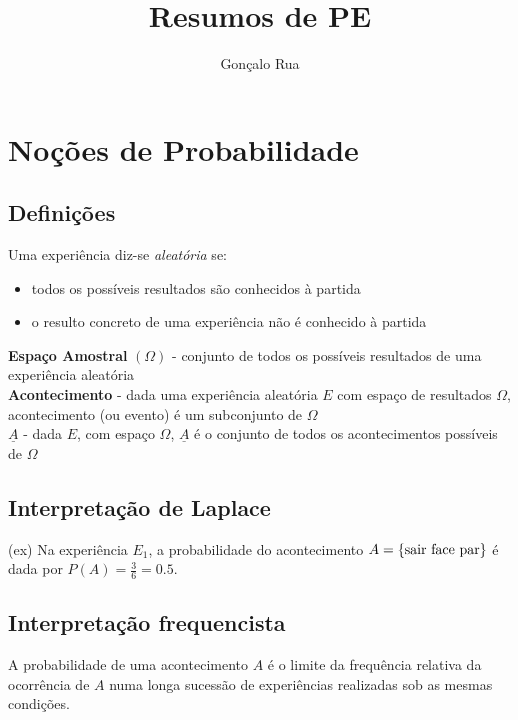 \documentclass{article}
\title{Resumos de PE}
\author{Gonçalo Rua}
\begin{document}
\maketitle

\section{Noções de Probabilidade}

\subsection{Definições}

Uma experiência diz-se \emph{aleatória} se:

\begin{itemize}
    \item todos os possíveis resultados são conhecidos à partida
    \item o resulto concreto de uma experiência não é conhecido à partida
\end{itemize}

\noindent \textbf{Espaço Amostral} $(\Omega)$ - conjunto de todos os possíveis resultados de uma experiência aleatória \\

\noindent \textbf{Acontecimento} - dada uma experiência aleatória $E$ com espaço de resultados $\Omega$, acontecimento (ou evento) é um subconjunto de $\Omega$ \\

\noindent \textbf{$\underline{A}$} - dada $E$, com espaço $\Omega$, $\underline{A}$ é o conjunto de todos os acontecimentos possíveis de $\Omega$

\subsection{Interpretação de Laplace}

(ex) Na experiência $E_1$, a probabilidade do acontecimento $A = \{\textnormal{sair face par}\}$ é dada por $P(A) = \frac{3}{6} = 0.5$.

\subsection{Interpretação frequencista}

A probabilidade de uma acontecimento $A$ é o limite da frequência relativa da ocorrência de $A$ numa longa sucessão de experiências realizadas sob as mesmas condições.
\end{document}
